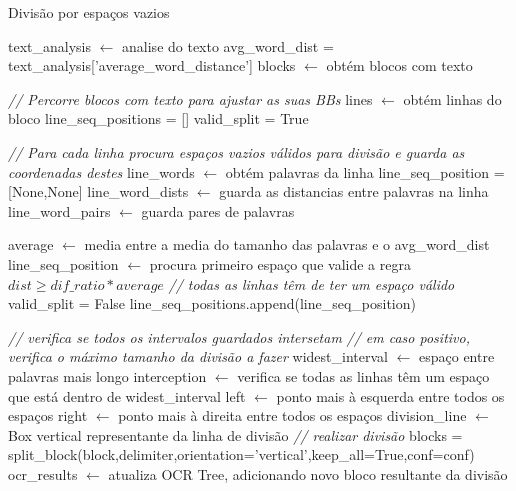 \begin{algorithm}[H]
	\caption{Divisão por espaços vazios}
	\scriptsize
	\begin{algorithmic}[1]
		
		\STATE text\_analysis $\leftarrow$ analise do texto
		\STATE avg\_word\_dist = text\_analysis['average\_word\_distance']
		\STATE blocks $\leftarrow$ obtém blocos com texto
		
		\STATE \textit{// Percorre blocos com texto para ajustar as suas BBs}
			\STATE lines $\leftarrow$ obtém linhas do bloco
			\STATE line\_seq\_positions = [] 
			\STATE valid\_split = True
			
			\STATE \textit{// Para cada linha procura espaços vazios válidos para divisão e guarda as coordenadas destes}
				\STATE line\_words $\leftarrow$ obtém palavras da linha
				\STATE line\_seq\_position = [None,None]
				\STATE line\_word\_dists $\leftarrow$ guarda as distancias entre palavras na linha
				\STATE line\_word\_pairs $\leftarrow$ guarda pares de palavras
				
					\STATE average $\leftarrow$ media entre a media do tamanho das palavras e o avg\_word\_dist
					\STATE line\_seq\_position $\leftarrow$ procura primeiro espaço que valide a regra $ dist \geq dif\_ratio * average$
						\STATE \textit{// todas as linhas têm de ter um espaço válido}
						\STATE valid\_split = False
					\ELSE
						\STATE line\_seq\_positions.append(line\_seq\_position)
					\ENDIF
				\ENDIF
				
			\ENDFOR
			
				\STATE \textit{// verifica se todos os intervalos guardados intersetam}
				\STATE \textit{// em caso positivo, verifica o máximo tamanho da divisão a fazer}
				\STATE widest\_interval $\leftarrow$ espaço entre palavras mais longo
				\STATE interception $\leftarrow$ verifica se todas as linhas têm um espaço que está dentro de widest\_interval
					\STATE left $\leftarrow$ ponto mais à esquerda entre todos os espaços
					\STATE right $\leftarrow$ ponto mais à direita entre todos os espaços
					\STATE division\_line $\leftarrow$ Box vertical representante da linha de divisão
					\STATE \textit{// realizar divisão}
					\STATE blocks =  split\_block(block,delimiter,orientation='vertical',keep\_all=True,conf=conf)
					\STATE ocr\_results $\leftarrow$ atualiza OCR Tree, adicionando novo bloco resultante da divisão
				\ENDIF
			\ENDIF
		\ENDFOR
		
		
	\end{algorithmic}
\end{algorithm}



